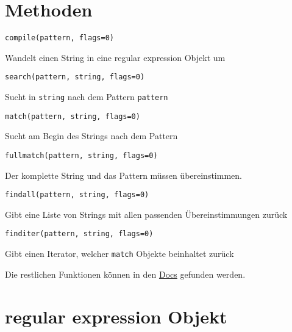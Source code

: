 \documentclass[ignorenonframetext,]{beamer}
\begin{document}
\section{Methoden}\label{methoden}

\begin{frame}[fragile]

\begin{verbatim}
compile(pattern, flags=0)
\end{verbatim}

Wandelt einen String in eine regular expression Objekt um

\begin{verbatim}
search(pattern, string, flags=0)
\end{verbatim}

Sucht in \texttt{string} nach dem Pattern \texttt{pattern}

\begin{verbatim}
match(pattern, string, flags=0)
\end{verbatim}

Sucht am Begin des Strings nach dem Pattern

\begin{verbatim}
fullmatch(pattern, string, flags=0)
\end{verbatim}

Der komplette String und das Pattern müssen übereinstimmen.

\end{frame}

\begin{frame}[fragile]

\begin{verbatim}
findall(pattern, string, flags=0)
\end{verbatim}

Gibt eine Liste von Strings mit allen passenden Übereinstimmungen zurück

\begin{verbatim}
finditer(pattern, string, flags=0)
\end{verbatim}

Gibt einen Iterator, welcher \texttt{match} Objekte beinhaltet zurück

Die restlichen Funktionen können in den
\href{https://docs.python.org/3/library/re.html}{Docs} gefunden werden.

\end{frame}

\section{regular expression Objekt}\label{regular-expression-objekt}
\end{document}
